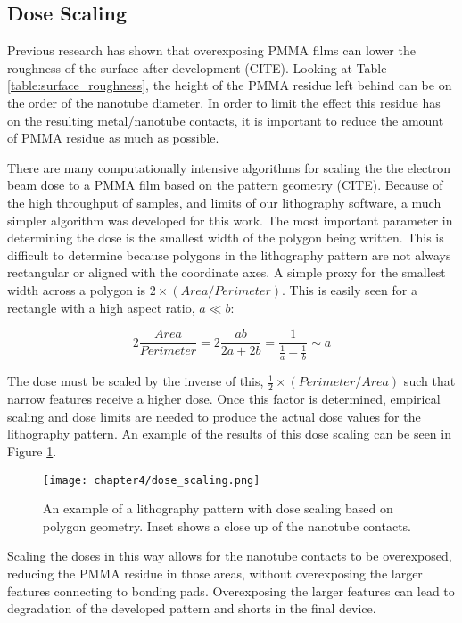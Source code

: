 \subsection{Dose Scaling}

Previous research has shown that overexposing PMMA films can lower the roughness of the surface after development (CITE). Looking at Table \ref{table:surface_roughness}, the height of the PMMA residue left behind can be on the order of the nanotube diameter. In order to limit the effect this residue has on the resulting metal/nanotube contacts, it is important to reduce the amount of PMMA residue as much as possible.

There are many computationally intensive algorithms for scaling the the electron beam dose to a PMMA film based on the pattern geometry (CITE). Because of the high throughput of samples, and limits of our lithography software, a much simpler algorithm was developed for this work. The most important parameter in determining the dose is the smallest width of the polygon being written. This is difficult to determine because polygons in the lithography pattern are not always rectangular or aligned with the coordinate axes. A simple proxy for the smallest width across a polygon is $2\times(Area/Perimeter)$. This is easily seen for a rectangle with a high aspect ratio, $a \ll b$:

\begin{equation}
    \label{eq:dose_scaling}
    2\frac{Area}{Perimeter} = 2\frac{ab}{2a+2b} = \frac{1}{\frac{1}{a}+\frac{1}{b}} \sim a
\end{equation}

The dose must be scaled by the inverse of this, $\frac{1}{2}\times(Perimeter/Area)$ such that narrow features receive a higher dose. Once this factor is determined, empirical scaling and dose limits are needed to produce the actual dose values for the lithography pattern. An example of the results of this dose scaling can be seen in Figure \ref{fig:dose_scaling}.

\begin{figure}
    \centering
    \texttt{[image: chapter4/dose\_scaling.png]}
    \caption{An example of a lithography pattern with dose scaling based on polygon geometry. Inset shows a close up of the nanotube contacts.}
    \label{fig:dose_scaling}
\end{figure}

Scaling the doses in this way allows for the nanotube contacts to be overexposed, reducing the PMMA residue in those areas, without overexposing the larger features connecting to bonding pads. Overexposing the larger features can lead to degradation of the developed pattern and shorts in the final device.

